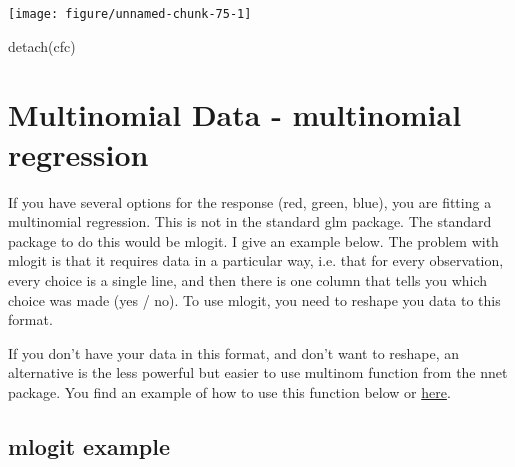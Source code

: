 \documentclass[a4paper,twoside]{tufte-book}\usepackage[]{graphicx}\usepackage[]{color}
\makeatletter
\def\maxwidth{ %
  \ifdim\Gin@nat@width>\linewidth
    \linewidth
  \else
    \Gin@nat@width
  \fi
}
\makeatother
\begin{document}
\begin{appendices}
\begin{Schunk}
\texttt{[image: figure/unnamed-chunk-75-1]} \begin{Sinput}
detach(cfc)
\end{Sinput}
\end{Schunk}



\section{Multinomial Data - multinomial regression}

If you have several options for the response (red, green, blue), you are fitting a multinomial regression. This is not in the standard glm package. The standard package to do this would be mlogit. I give an example below. The problem with mlogit is that it requires data in a particular way, i.e. that for every observation, every choice is a single line, and then there is one column that tells you which choice was made (yes / no). To use mlogit, you need to reshape you data to this format. 

If you don't have your data in this format, and don't want to reshape, an alternative is the less powerful but easier to use multinom function from the nnet package. You find an example of how to use this function below or \href{http://www.ats.ucla.edu/stat/stata/dae/mlogit.htm}{here}.

\subsection{mlogit example}



\end{appendices}
\end{document}
